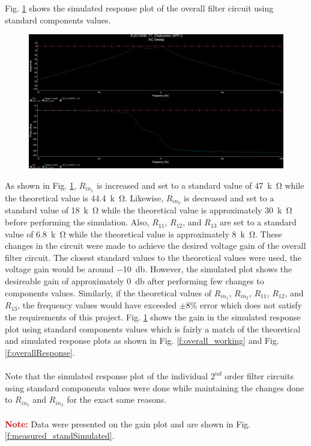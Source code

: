 \documentclass[hidelinks]{article}
\begin{document}
	\pagebreak
	\noindent Fig. \ref{f:sim_overallStand} shows the simulated response plot of the overall filter circuit using standard components values.
	\begin{figure}[htbp]
		\centering
		\includegraphics[width=0.7\textheight]{sim_overallStand.png}
		\label{f:sim_overallStand}
	\end{figure}	
	
	\noindent As shown in Fig. \ref{f:sim_overallStand}, $R_{in_1}$ is increased and set to a standard value of \SI{47}{k\ohm} while the theoretical value is \SI{44.4}{k\ohm}. 
	Likewise, $R_{in_2}$ is decreased and set to a standard value of \SI{18}{k\ohm} while the theoretical value is approximately \SI{30}{k\ohm} before performing the simulation.
	Also, $R_{11}$, $R_{12}$, and $R_{13}$ are set to a standard value of \SI{6.8}{k\ohm} while the theoretical value is approximately \SI{8}{k\ohm}.
	These changes in the circuit were made to achieve the desired voltage gain of the overall filter circuit.
	The closest standard values to the theoretical values were used, the voltage gain would be around \SI{-10}{\decibel}. However, the simulated plot shows the desireable gain of approximately \SI{0}{\decibel} after performing few changes to components values.
	Similarly, if the theoretical values of $R_{in_1}$, $R_{in_2}$, $R_{11}$, $R_{12}$, and $R_{13}$, the frequency values would have exceeded $\pm$8\% error which does not satisfy the requirements of this project.
	Fig. \ref{f:sim_overallStand} shows the gain in the simulated response plot using standard components values which is fairly a match of the theoretical and simulated response plots as shown in Fig. \ref{f:overall_working} and Fig. \ref{f:overallResponse}.\\\\
	Note that the simulated response plot of the individual $2^{nd}$ order filter circuits using standard components values were done while maintaining the changes done to $R_{in_1}$ and $R_{in_2}$ for the exact same reasons.\\\\
	\textcolor{red}{\textbf{Note:}} Data were presented on the gain plot and are shown in Fig. \ref{f:measured_standSimulated}.
	
\end{document}
